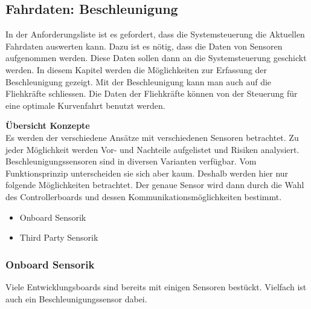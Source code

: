 \documentclass[../../main.tex]{subfiles}
\begin{document}
    \subsection{Fahrdaten: Beschleunigung} \label{fahr_beschleunigung}
    In der Anforderungsliste ist es gefordert, dass die Systemsteuerung die Aktuellen Fahrdaten auswerten kann. Dazu ist es nötig, dass die Daten von Sensoren aufgenommen werden. Diese Daten sollen dann an die Systemsteuerung geschickt werden. In diesem Kapitel werden die Möglichkeiten zur Erfassung der Beschleunigung gezeigt. Mit der Beschleunigung kann man auch auf die Fliehkräfte schliessen. Die Daten der Fliehkräfte können von der Steuerung für eine optimale Kurvenfahrt benutzt werden.

    \textbf{Übersicht Konzepte}\\
    Es werden der verschiedene Ansätze mit verschiedenen Sensoren betrachtet. Zu jeder Möglichkeit werden Vor- und Nachteile aufgelistet und Risiken analysiert.
    Beschleunigungssensoren sind in diversen Varianten verfügbar. Vom Funktionsprinzip unterscheiden sie sich aber kaum. Deshalb werden hier nur folgende Möglichkeiten betrachtet. Der genaue Sensor wird dann durch die Wahl des Controllerboards und dessen Kommunikationsmöglichkeiten bestimmt.
    \begin{itemize}
        \item Onboard Sensorik
        \item Third Party Sensorik
    \end{itemize}

    \subsubsection{Onboard Sensorik}
    Viele Entwicklungsboards sind bereits mit einigen Sensoren bestückt. Vielfach ist auch ein Beschleunigungssensor dabei.
\end{document}
